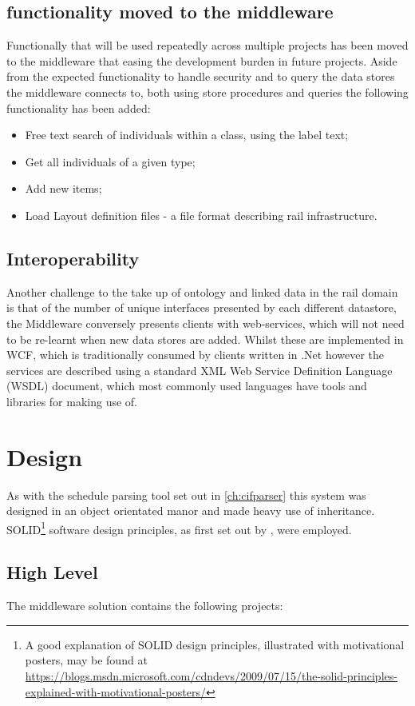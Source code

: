 \subsection{functionality moved to the middleware}\label{midfunc}
Functionally that will be used repeatedly across multiple projects has been moved to the middleware that easing the development burden in future projects. Aside from the expected functionality to handle security and to query the data stores the middleware connects to, both using store procedures and queries the following functionality has been added:
\begin{itemize}
    \item Free text search of individuals within a class, using the label text;
    \item Get all individuals of a given type;
    \item Add new items;
    \item Load Layout definition files - a file format describing rail infrastructure.
\end{itemize}

\subsection{Interoperability}
Another challenge to the take up of ontology and linked data in the rail domain is that of the number of unique interfaces presented by each different datastore, the Middleware conversely presents clients with web-services, which will not need to be re-learnt when new data stores are added. Whilst these are implemented in WCF, which is traditionally consumed by clients written in .Net however the services are described using a standard XML Web Service Definition Language (WSDL) document, which most commonly used languages have tools and libraries for making use of. 

\section{Design}
As with the schedule parsing tool set out in \autoref{ch:cifparser} this system was designed in an object orientated manor and made heavy use of inheritance. SOLID\footnote{A good explanation of SOLID design principles, illustrated with motivational posters, may be found at \url{https://blogs.msdn.microsoft.com/cdndevs/2009/07/15/the-solid-principles-explained-with-motivational-posters/}} software design principles, as first set out by \citet{Martin2003}, were employed. 
\subsection{High Level}
The middleware solution contains the following projects:

